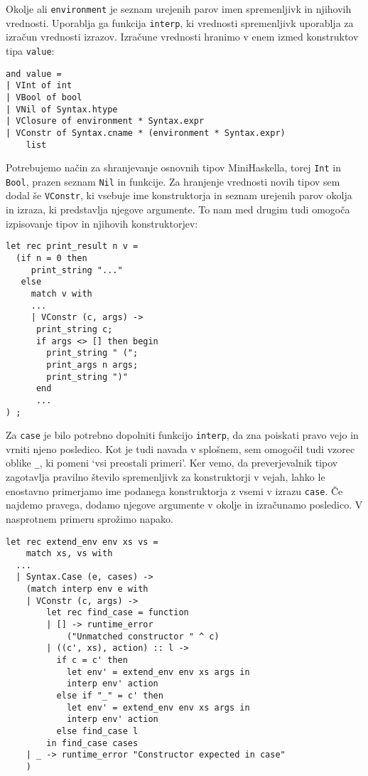 \documentclass[12pt,a4paper,openany]{book}
\begin{document}
Okolje ali \lstinline{environment} je seznam urejenih parov imen spremenljivk in njihovih vrednosti. Uporablja ga funkcija \lstinline{interp}, ki vrednosti spremenljivk uporablja za izračun 
vrednosti izrazov. Izračune vrednosti hranimo v enem izmed konstruktov tipa \lstinline{value}: 
\begin{lstlisting}
and value =
| VInt of int
| VBool of bool
| VNil of Syntax.htype
| VClosure of environment * Syntax.expr
| VConstr of Syntax.cname * (environment * Syntax.expr) 
    list
\end{lstlisting}
Potrebujemo način za shranjevanje osnovnih tipov MiniHaskella, torej \lstinline{Int} in \lstinline{Bool}, prazen seznam \lstinline{Nil} in funkcije. Za hranjenje vrednosti novih tipov sem dodal še 
\lstinline{VConstr}, ki vsebuje ime konstruktorja in seznam urejenih parov okolja in izraza, ki predstavlja njegove argumente. To nam med drugim tudi omogoča izpisovanje tipov in njihovih 
konstruktorjev:
\begin{lstlisting}
let rec print_result n v =
  (if n = 0 then
     print_string "..."
   else
     match v with
     ...
     | VConstr (c, args) ->
      print_string c;
      if args <> [] then begin
        print_string " (";
        print_args n args;
        print_string ")"
      end
      ...
) ;
\end{lstlisting}

Za \lstinline{case} je bilo potrebno dopolniti funkcijo \lstinline{interp}, da zna poiskati pravo vejo in vrniti njeno posledico. Kot je tudi navada v splošnem, sem omogočil tudi vzorec oblike \lstinline{_}, ki 
pomeni `vsi preostali primeri'. Ker vemo, da preverjevalnik tipov zagotavlja pravilno število spremenljivk za konstruktorji v vejah, lahko le enostavno primerjamo ime podanega 
konstruktorja z vsemi v izrazu \lstinline{case}. Če najdemo pravega, dodamo njegove argumente v okolje in izračunamo posledico. V nasprotnem primeru sprožimo napako. 
\begin{lstlisting}
let rec extend_env env xs vs =
    match xs, vs with
  ...
  | Syntax.Case (e, cases) ->
    (match interp env e with
    | VConstr (c, args) ->
        let rec find_case = function
        | [] -> runtime_error 
            ("Unmatched constructor " ^ c)
        | ((c', xs), action) :: l ->
          if c = c' then
            let env' = extend_env env xs args in
            interp env' action
          else if "_" = c' then
            let env' = extend_env env xs args in
            interp env' action
          else find_case l
        in find_case cases
    | _ -> runtime_error "Constructor expected in case"
    )
\end{lstlisting}
\end{document}
